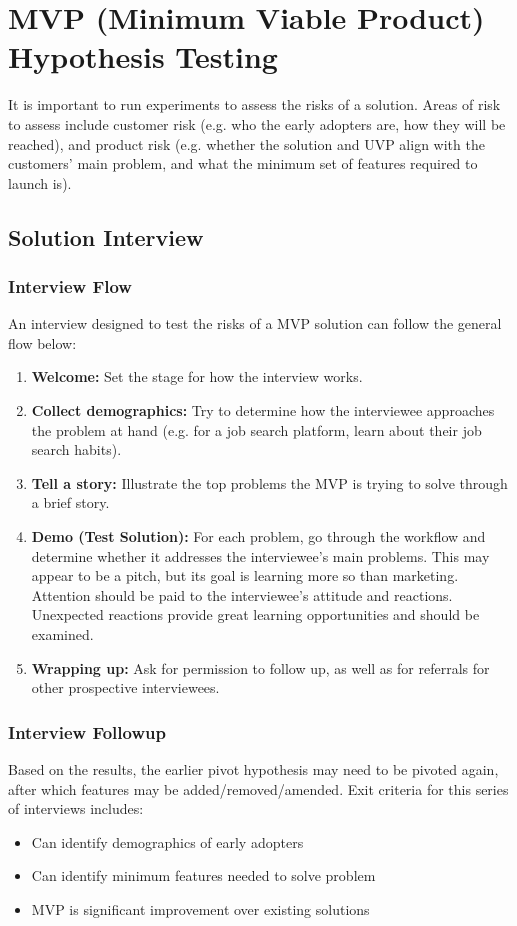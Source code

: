 \documentclass[12pt,titlepage]{article}
\let\stdsection\section
\renewcommand\section{\clearpage\stdsection}
\begin{document}
  \section{MVP (Minimum Viable Product) Hypothesis Testing}
    It is important to run experiments to assess the risks of a solution. Areas of risk to assess include customer risk (e.g. who the
    early adopters are, how they will be reached), and product risk (e.g. whether the solution and UVP align with the customers' main
    problem, and what the minimum set of features required to launch is).

    \subsection{Solution Interview}
      \subsubsection{Interview Flow}
        An interview designed to test the risks of a MVP solution can follow the general flow below:
        \begin{enumerate}
          \item \textbf{Welcome:} Set the stage for how the interview works.
          \item \textbf{Collect demographics:} Try to determine how the interviewee approaches the problem at hand (e.g. for a job search platform,
          learn about their job search habits).
          \item \textbf{Tell a story:} Illustrate the top problems the MVP is trying to solve through a brief story.
          \item \textbf{Demo (Test Solution):} For each problem, go through the workflow and determine whether it addresses the interviewee's main
          problems. This may appear to be a pitch, but its goal is learning more so than marketing. Attention should be paid to the interviewee's
          attitude and reactions. Unexpected reactions provide great learning opportunities and should be examined.
          \item \textbf{Wrapping up:} Ask for permission to follow up, as well as for referrals for other prospective interviewees.
        \end{enumerate}

      \subsubsection{Interview Followup}
        Based on the results, the earlier pivot hypothesis may need to be pivoted again, after which features may be added/removed/amended.
        Exit criteria for this series of interviews includes:
        \begin{itemize}
          \item Can identify demographics of early adopters
          \item Can identify minimum features needed to solve problem
          \item MVP is significant improvement over existing solutions
        \end{itemize}
\end{document}
